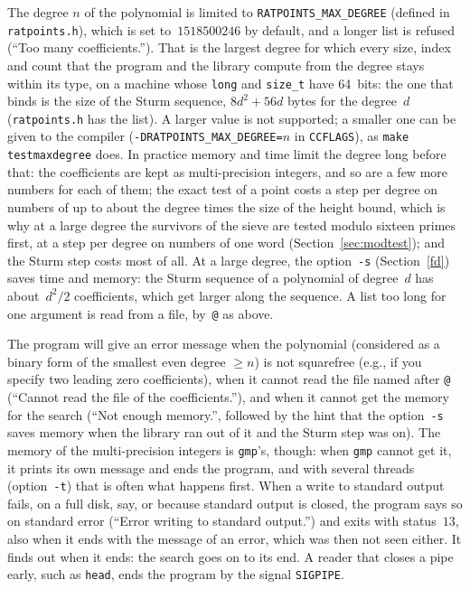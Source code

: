 \documentclass[12pt,a4paper,oneside]{amsart}
\begin{document}
The degree $n$ of the polynomial is limited to \texttt{RATPOINTS\_MAX\_DEGREE}
(defined in \texttt{ratpoints.h}), which is set to~$1518500246$ by default,
and a longer list is refused (``Too many coefficients.''). That is the
largest degree for which every size, index and count that the program and
the library compute from the degree stays within its type, on a machine
whose \texttt{long} and \texttt{size\_t} have 64~bits: the one that binds
is the size of the Sturm sequence, $8d^2 + 56d$ bytes for the degree~$d$
(\texttt{ratpoints.h} has the list). A larger value is not supported; a
smaller one can be given to the compiler (\verb+-DRATPOINTS_MAX_DEGREE=+$n$
in \verb+CCFLAGS+), as \texttt{make testmaxdegree} does. In practice memory
and time limit the degree long before that: the coefficients are kept as
multi-precision integers, and so are a few more numbers for each of them;
the exact test of a point costs a step per degree on numbers of up to
about the degree times the size of the height bound, which is why at a
large degree the survivors of the sieve are tested modulo sixteen primes
first, at a step per degree on numbers of one word
(Section~\ref{sec:modtest}); and the Sturm step costs most of all. At a
large degree, the option~\verb+-s+ (Section~\ref{fd}) saves time and
memory: the Sturm sequence of a
polynomial of degree~$d$ has about~$d^2/2$ coefficients, which get larger
along the sequence. A list too long for one argument is read from a file,
by~\verb+@+ as above.

The program will give an error message when the polynomial (considered
as a binary form of the smallest even degree $\ge n$) is not squarefree
(e.g., if you specify two leading zero coefficients), when it cannot read
the file named after \verb+@+ (``Cannot read the file of the
coefficients.''), and when it cannot
get the memory for the search (``Not enough memory.'', followed by the
hint that the option~\verb+-s+ saves memory when the library ran out of it
and the Sturm step was on). The memory of the
multi-precision integers is \texttt{gmp}'s, though: when \texttt{gmp}
cannot get it, it prints its own message and ends the program, and with
several threads (option~\verb+-t+) that is often what happens first.
When a write to standard output fails, on a full disk, say, or because
standard output is closed, the program says so on standard error (``Error
writing to standard output.'') and exits with status~$13$, also when it ends
with the message of an error, which was then not seen either. It finds out
when it ends: the search goes on to its end. A reader that closes a pipe
early, such as \texttt{head}, ends the program by the signal
\texttt{SIGPIPE}.
\end{document}

